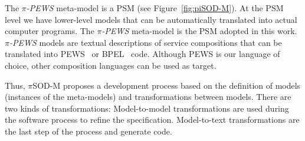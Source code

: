 The \textit{$\pi$-PEWS} meta-model is a PSM (see Figure~\ref{fig:piSOD-M}).
At the PSM level we have lower-level models that can be automatically translated into actual computer programs.
The \textit{$\pi$-PEWS} meta-model is the PSM adopted in this work.
\textit{$\pi$-PEWS} models are textual descriptions of service compositions that can be translated into PEWS~\cite{BaCAM05,Placido2010LTPD} or BPEL~\cite{bpel03} code.
Although PEWS is our language of choice, other composition languages can be used as target.





%
Thus, $\pi$SOD-M proposes a development process based on the definition of models
(instances of the meta-models) and transformations between models.
There are two kinds of transformations:
Model-to-model transformations are used during the software process to refine the specification.
Model-to-text transformations are the last step of the process and generate code.

